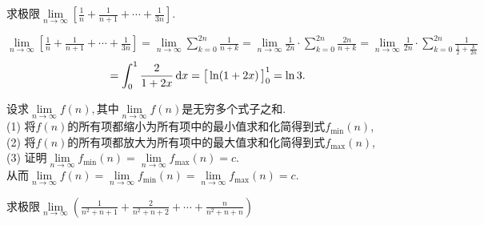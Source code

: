 \examples 求极限$\displaystyle \lim\limits_{n \to \infty}\left[ \frac 1n +\frac {1}{n+1}+\cdots+\frac{1}{3n}\right] $.

\solve 
$
\displaystyle
\lim\limits_{n \to \infty}\left[ \frac 1n +\frac {1}{n+1}+\cdots+\frac{1}{3n}\right] 
=\lim\limits_{n \to \infty}\sum_{k=0}^{2n}\frac{1}{n+k}
=\lim\limits_{n \to \infty}\frac{1}{2n}\cdot \sum_{k=0}^{2n}\frac{2n}{n+k}
=\lim\limits_{n \to \infty}\frac{1}{2n}\cdot \sum_{k=0}^{2n}\frac{1}{\frac{1}{2}+\frac{k}{2n}}
$
\[
=\int_{0}^{1}\frac{2}{1+2x}\,\d x=\big[\ln(1+2x)\,\big]_0^1=\ln 3.
\vspace*{-0.5em}
\]

\summarize
[
\kg 本题没有给出和式表达式,需要我们自己写成和式的形式,以方便构造积分的形式.\\
\kg 本题中和式的上限不是$n$而是$2n$,那么这个时候整个积分区间就不是被等分成$n$份,而是$2n$份,因此,我们要构造关于变量$\dfrac{i}{2n}$的函数,即
\begin{equation}
	\lim\limits_{n \to \infty}\frac{1}{2n}\cdot\sum_{i=1}^{2n}f\left(\frac{i}{2n}\right)
\end{equation}
\kg 积分的上下限由变量$\dfrac{i}{n}$(本题$\dfrac{i}{2n}$)的范围所确定,如本题$i =1,2,\ldots,2n,\lim\limits_{n \to \infty}\dfrac{i}{2n}=0,1.$.因此积分的上下限是0,1.
]
\vspace{1em}

\noindent \highlights[2. 夹逼定理法]

\vspace*{1em} \noindent  \hspace*{0.2em}  \hspace{1.5em}
设求$\lim\limits_{n \to \infty}f(n),$其中$\lim\limits_{n \to \infty}f(n)$是无穷多个式子之和.\\[0.2em]
\qquad (1) \quad 将$f(n)$的所有项都缩小为所有项中的最小值求和化简得到式$f_{\min}(n)$,\\[0.2em]
\qquad (2) \quad 将$f(n)$的所有项都放大为所有项中的最大值求和化简得到式$f_{\max}(n)$,\\[0.2em]
\qquad (3) \quad 证明$\lim\limits_{n \to \infty}f_{\min}(n)=\lim\limits_{n \to \infty}f_{\max}(n)=c.$\\[0.2em]
从而$\lim\limits_{n \to \infty}f(n)=\lim\limits_{n \to \infty}f_{\min}(n)=\lim\limits_{n \to \infty}f_{\max}(n)=c.$

\clearpage
\examples 求极限$\displaystyle \lim\limits_{n \to \infty}\left(\frac{1}{n^2+n+1}+\frac{2}{n^2+n+2}+\cdots+\frac{n}{n^2+n+n}\right)$


